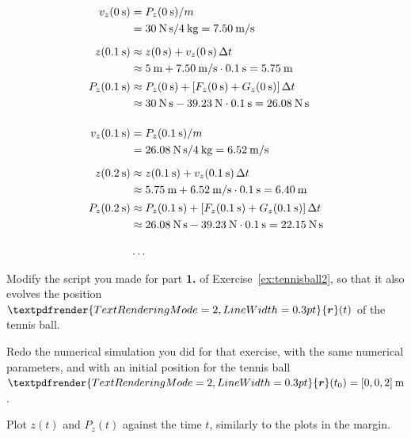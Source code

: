 \documentclass[a4paper,12pt,%
onecolumn,oneside,%
british%
]{memoir}
\renewcommand*{\bm}[1]{\textpdfrender{TextRenderingMode=2,LineWidth=0.3pt}{\boldsymbol{#1}}}
\newcommand*{\incr}{\Delta}%
\renewcommand*{\|}[1][]{\nonscript\:#1\vert\nonscript\:\mathopen{}}
\newcommand*{\yr}{\bm{r}}
\newcommand*{\yti}{t_{0}}
\newcommand*{\Dt}{\incr t}
\newcommand*{\yM}{m}%
\begin{document}
\begin{equation*}
  \begin{aligned}
    v_{z}(\qty{0}{s}) &= P_{z}(\qty{0}{s})/\yM\\
    &=\qty{30}{N\,s}/\qty{4}{kg} = \qty{7.50}{m/s}
    \\[2\jot]
    z(\qty{0.1}{s})  &\approx z(\qty{0}{s}) + v_{z}(\qty{0}{s})\,\Dt\\
    &\approx \qty{5}{m} + \qty{7.50}{m/s}\cdot\qty{0.1}{s} = \qty{5.75}{m}
    \\[0.5\jot]
    P_{z}(\qty{0.1}{s})  &\approx P_{z}(\qty{0}{s}) + [F_{z}(\qty{0}{s}) + G_{z}(\qty{0}{s})]\,\Dt \\
    &\approx\qty{30}{N\,s} -\qty{39.23}{N}\cdot\qty{0.1}{s} = \qty{26.08}{N\,s}
    \\[4\jot]
    v_{z}(\qty{0.1}{s}) &= P_{z}(\qty{0.1}{s})/\yM\\
    &=\qty{26.08}{N\,s}/\qty{4}{kg} = \qty{6.52}{m/s}
    \\[2\jot]
    z(\qty{0.2}{s})  &\approx z(\qty{0.1}{s}) + v_{z}(\qty{0.1}{s})\,\Dt\\
    &\approx \qty{5.75}{m} + \qty{6.52}{m/s}\cdot\qty{0.1}{s} = \qty{6.40}{m}
    \\[0.5\jot]
    P_{z}(\qty{0.2}{s})  &\approx P_{z}(\qty{0.1}{s}) + [F_{z}(\qty{0.1}{s}) + G_{z}(\qty{0.1}{s})]\,\Dt\\
    &\approx\qty{26.08}{N\,s} -\qty{39.23}{N}\cdot\qty{0.1}{s} = \qty{22.15}{N\,s}
    \\[3\jot]
    &\dotso
  \end{aligned}
\end{equation*}

\begin{exercise}[label={ex:tennisball3}]
  Modify the script you made for part \textbf{1.} of Exercise~\ref{ex:tennisball2}, so that it also evolves the position $\yr(t)$ of the tennis ball.

  Redo the numerical simulation you did for that exercise, with the same numerical parameters, and with an initial position for the tennis ball $\yr(\yti) = [0,0,2]\:\unit{m}$.

  Plot $z(t)$ and $P_{z}(t)$ against the time $t$, similarly to the plots in the margin.
\end{exercise}
\end{document}
